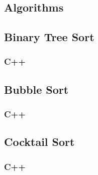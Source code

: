\documentclass{subfile}
\begin{document}
\begin{appendices}
  \section{Algorithms}
  \subsection{Binary Tree Sort}\label{APENDIX:BT}
  \subsubsection{C++}
  
  
  \newpage
  \subsection{Bubble Sort}\label{APENDIX:B}
  \subsubsection{C++}
  
  
  \newpage
  \subsection{Cocktail Sort}\label{APENDIX:CT}
  \subsubsection{C++}
  
  
  \newpage
\end{appendices}
\end{document}
